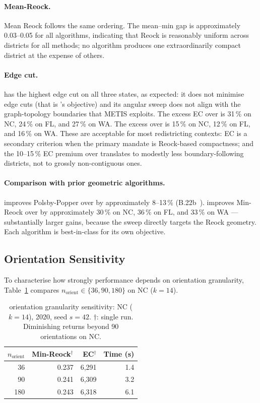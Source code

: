 \paragraph{Mean-Reock.}
Mean Reock follows the same ordering.
The mean--min gap is approximately 0.03--0.05 for all algorithms, indicating
that Reock is reasonably uniform across districts for all methods; no algorithm
produces one extraordinarily compact district at the expense of others.

\paragraph{Edge cut.}
\mka{} has the highest edge cut on all three states, as expected: it does
not minimise edge cuts (that is \metis{}'s objective) and its angular sweep
does not align with the graph-topology boundaries that METIS exploits.
The excess EC over \metis{} is 31\,\% on NC, 24\,\% on FL, and 27\,\% on WA.
The excess over \cvdgeo{} is 15\,\% on NC, 12\,\% on FL, and 16\,\% on WA.
These are acceptable for most redistricting contexts: EC is a secondary
criterion when the primary mandate is Reock-based compactness; and the 10--15\,\%
EC premium over \cvdgeo{} translates to modestly less boundary-following districts,
not to grossly non-contiguous ones.

\paragraph{Comparison with prior geometric algorithms.}
\cvdgeo{} improves Polsby-Popper over \metis{} by approximately 8--13\,\%
(B.22b~\citep{dellaLibera2026cvdgeo}).
\mka{} improves Min-Reock over \metis{} by approximately 30\,\% on NC,
36\,\% on FL, and 33\,\% on WA --- substantially larger gains, because
the sweep directly targets the Reock geometry.
Each algorithm is best-in-class for its own objective.

\subsection{Orientation Sensitivity}

To characterise how strongly performance depends on orientation granularity,
Table~\ref{tab:orientation-sensitivity} compares $n_{\mathrm{orient}} \in \{36, 90, 180\}$
on NC ($k=14$).

\begin{table}[h]
\centering
\caption{%
  \mka{} orientation granularity sensitivity: NC ($k=14$), 2020, seed $s=42$.
  $\dagger$: single run.
  Diminishing returns beyond 90 orientations on NC.
}
\label{tab:orientation-sensitivity}
\renewcommand{\arraystretch}{1.25}
\begin{tabular}{@{}rrrr@{}}
\toprule
$n_{\mathrm{orient}}$ & Min-Reock$^\dagger$ & EC$^\dagger$ & Time (s) \\
\midrule
 36 & 0.237 & 6{,}291 & 1.4 \\
 90 & 0.241 & 6{,}309 & 3.2 \\
180 & 0.243 & 6{,}318 & 6.1 \\
\bottomrule
\end{tabular}
\end{table}

